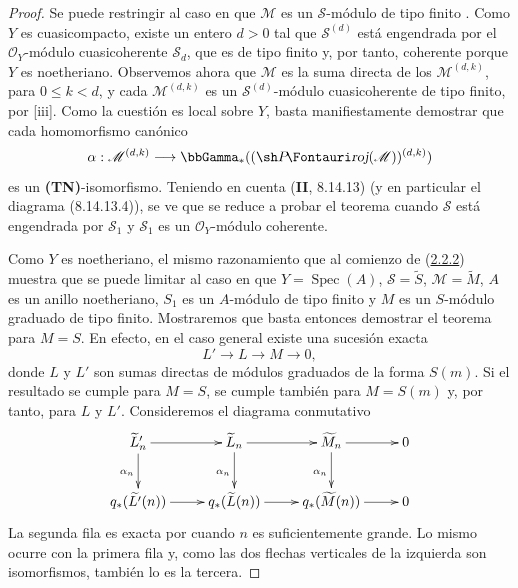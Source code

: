 \begin{proof}
Se puede restringir al caso en que $\mathcal M$ es un $\mathcal S$-módulo de tipo finito .
Como $Y$ es cuasicompacto, existe un entero $d>0$ tal que $\mathcal S^{(d)}$ está engendrada por el $\mathcal O_Y$-módulo cuasicoherente $\mathcal S_d$, que es de tipo finito  y, por tanto, coherente porque $Y$ es noetheriano. Observemos ahora que $\mathcal M$ es la suma directa de los $\mathcal M^{(d,k)}$, para $0\leq k<d$, y cada $\mathcal M^{(d,k)}$ es un $\mathcal S^{(d)}$-módulo cuasicoherente de tipo finito, por [iii].
Como la cuestión es local sobre $Y$, basta manifiestamente demostrar que cada homomorfismo canónico
\[
\alpha:\mathcal M^{(d,k)}
\longrightarrow\bbGamma_*((\shProj(\mathcal M))^{(d,k)})
\] es un \textbf{(TN)}-isomorfismo. Teniendo en cuenta (\textbf{II}, 8.14.13) (y en particular el diagrama (8.14.13.4)), se ve que se reduce a probar el teorema cuando $\mathcal S$ está engendrada por $\mathcal S_1$ y $\mathcal S_1$ es un $\mathcal O_Y$-módulo coherente.

Como $Y$ es noetheriano, el mismo razonamiento que al comienzo de
(\hyperref[III.2.2.2-fr]{2.2.2}) muestra que se puede limitar al caso en que
$Y=\operatorname{Spec}(A)$, $\mathcal S=\widetilde S$,
$\mathcal M=\widetilde M$, $A$ es un anillo noetheriano, $S_1$ es un $A$-módulo de tipo finito y $M$ es un $S$-módulo graduado de tipo finito.
Mostraremos que basta entonces demostrar el teorema para $M=S$.
En efecto, en el caso general existe una sucesión exacta
\[
L'\longrightarrow L\longrightarrow M\longrightarrow0,
\]
donde $L$ y $L'$ son sumas directas de módulos graduados de la forma $S(m)$.
Si el resultado se cumple para $M=S$, se cumple también para $M=S(m)$ y, por tanto, para $L$ y $L'$.
Consideremos el diagrama conmutativo
\[
\xymatrix{
\widetilde{L}'_n\ar[r]\ar[d]_{\alpha_n} &
\widetilde{L}_n\ar[r]\ar[d]_{\alpha_n} &
\widetilde{M}_n\ar[r]\ar[d]_{\alpha_n} & 0\\
q_*(\widetilde {L'}(n))\ar[r] &
q_*(\widetilde L(n))\ar[r] &
q_*(\widetilde M(n))\ar[r] & 0
}
\]
La segunda fila es exacta por  cuando $n$ es suficientemente grande.
Lo mismo ocurre con la primera fila y, como las dos flechas verticales de la izquierda son isomorfismos, también lo es la tercera.


\end{proof}
